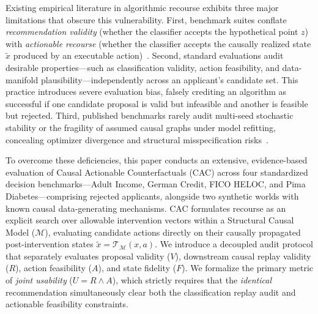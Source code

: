 \documentclass[nolineno]{paper/ieee-access/ieeeaccess}%
\newcommand{\CAC}{CAC}
\newcommand{\SCM}{\ensuremath{\mathcal{M}}}
\newcommand{\Replay}{\ensuremath{\mathcal{T}_{\SCM}}}
\begin{document}
Existing empirical literature in algorithmic recourse exhibits three major limitations that obscure this vulnerability. First, benchmark suites conflate \emph{recommendation validity} (whether the classifier accepts the hypothetical point $z$) with \emph{actionable recourse} (whether the classifier accepts the causally realized state $\widetilde{x}$ produced by an executable action)~\cite{pawelczyk2021carla, upadhyay2021robust}. Second, standard evaluations audit desirable properties---such as classification validity, action feasibility, and data-manifold plausibility---independently across an applicant's candidate set. This practice introduces severe evaluation bias, falsely crediting an algorithm as successful if one candidate proposal is valid but infeasible and another is feasible but rejected. Third, published benchmarks rarely audit multi-seed stochastic stability or the fragility of assumed causal graphs under model refitting, concealing optimizer divergence and structural misspecification risks~\cite{pawelczyk2021carla, upadhyay2021robust}.

To overcome these deficiencies, this paper conducts an extensive, evidence-based evaluation of Causal Actionable Counterfactuals (\CAC{}) across four standardized decision benchmarks---Adult Income, German Credit, FICO HELOC, and Pima Diabetes---comprising \TotalApplicants{} rejected applicants, alongside two synthetic worlds with known causal data-generating mechanisms. \CAC{} formulates recourse as an explicit search over allowable intervention vectors within a Structural Causal Model (\SCM{}), evaluating candidate actions directly on their causally propagated post-intervention states $\widetilde{x}=\Replay(x, a)$. We introduce a decoupled audit protocol that separately evaluates proposal validity ($V$), downstream causal replay validity ($R$), action feasibility ($A$), and state fidelity ($F$). We formalize the primary metric of \emph{joint usability} ($U = R \land A$), which strictly requires that the \emph{identical} recommendation simultaneously clear both the classification replay audit and actionable feasibility constraints.
\end{document}
